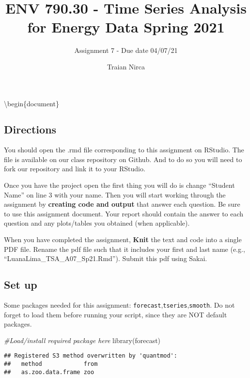\documentclass[
]{article}
\title{ENV 790.30 - Time Series Analysis for Energy Data \textbar{}
Spring 2021}
\subtitle{Assignment 7 - Due date 04/07/21}
\author{Traian Nirca}
\date{}
\newenvironment{Shaded}{\begin{snugshade}}{\end{snugshade}}
\newcommand{\CommentTok}[1]{\textcolor[rgb]{0.56,0.35,0.01}{\textit{#1}}}
\newcommand{\FunctionTok}[1]{\textcolor[rgb]{0.00,0.00,0.00}{#1}}
\newcommand{\NormalTok}[1]{#1}
\begin{document}
\maketitle

\textbackslash begin\{document\}

\hypertarget{directions}{%
\subsection{Directions}\label{directions}}

You should open the .rmd file corresponding to this assignment on
RStudio. The file is available on our class repository on Github. And to
do so you will need to fork our repository and link it to your RStudio.

Once you have the project open the first thing you will do is change
``Student Name'' on line 3 with your name. Then you will start working
through the assignment by \textbf{creating code and output} that answer
each question. Be sure to use this assignment document. Your report
should contain the answer to each question and any plots/tables you
obtained (when applicable).

When you have completed the assignment, \textbf{Knit} the text and code
into a single PDF file. Rename the pdf file such that it includes your
first and last name (e.g., ``LuanaLima\_TSA\_A07\_Sp21.Rmd''). Submit
this pdf using Sakai.

\hypertarget{set-up}{%
\subsection{Set up}\label{set-up}}

Some packages needed for this assignment:
\texttt{forecast},\texttt{tseries},\texttt{smooth}. Do not forget to
load them before running your script, since they are NOT default
packages.

\begin{Shaded}
\begin{Highlighting}[]
\CommentTok{\#Load/install required package here}
\FunctionTok{library}\NormalTok{(forecast)}
\end{Highlighting}
\end{Shaded}

\begin{verbatim}
## Registered S3 method overwritten by 'quantmod':
##   method            from
##   as.zoo.data.frame zoo
\end{verbatim}
\end{document}
